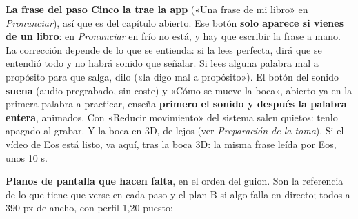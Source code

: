 \documentclass[11pt,a4paper]{article}
\begin{document}
\begin{ve}
\textbf{La frase del paso Cinco la trae la app} («Una frase de mi libro» en
\emph{Pronunciar}), así que es del capítulo abierto. Ese botón \textbf{solo aparece si
vienes de un libro}: en \emph{Pronunciar} en frío no está, y hay que escribir la frase a
mano. La corrección depende de lo que se
entienda: si la lees perfecta, dirá que se entendió todo y no habrá sonido que
señalar. Si lees alguna palabra mal a propósito para que salga, dilo («la digo
mal a propósito»). El botón del sonido \textbf{suena} (audio pregrabado, sin coste) y
«Cómo se mueve la boca», abierto ya en la primera palabra a practicar, enseña
\textbf{primero el sonido y después la palabra entera}, animados. Con «Reducir movimiento» del sistema salen quietos:
tenlo apagado al grabar. Y la boca en 3D, de lejos (ver \emph{Preparación de
la toma}). Si el vídeo de Eos está listo, va aquí, tras la boca 3D: la misma frase leída por Eos, unos 10 s.

\textbf{Planos de pantalla que hacen falta}, en el orden del guion. Son la
referencia de lo que tiene que verse en cada paso y el plan B si algo falla en
directo; todos a 390 px de ancho, con perfil 1,20 puesto:


\end{ve}
\end{document}
